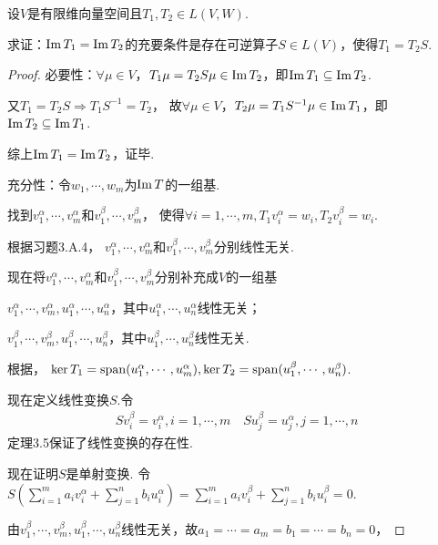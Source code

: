 \newpage

\begin{problem}[5]\label{3.D.5}
    设\(V\)是有限维向量空间且\(T_1,T_2 \in L(V,W)\).

    求证：\(\operatorname{Im} T_1=\operatorname{Im} T_2\)的充要条件是存在可逆算子\(S \in L(V)\)，使得\(T_1=T_2S\).    
\end{problem}

\begin{proof}
    必要性：\(\forall \mu \in V\)，\(T_1 \mu =T_2S \mu \in \operatorname{Im} T_2\)，即\(\operatorname{Im} T_1 \subseteq \operatorname{Im} T_2\).

    又\(T_1=T_2S \Rightarrow T_1S^{-1}=T_2\)，
    故\(\forall \mu \in V\)，\(T_2 \mu =T_1S^{-1} \mu \in \operatorname{Im} T_1\)，即\(\operatorname{Im} T_2 \subseteq \operatorname{Im} T_1\).
    
    综上\(\operatorname{Im} T_1=\operatorname{Im} T_2\)，证毕.
    
    充分性：令\(w_1,\cdots,w_m\)为\(\operatorname{Im} T\)的一组基.
    
    找到\(v_1^\alpha,\cdots,v_m^\alpha\)和\(v_1^\beta,\cdots,v_m^\beta\)，
    使得\(\forall i=1,\cdots,m,T_1v_i^\alpha=w_i,T_2v_i^\beta=w_i\).
    
    根据习题3.A.4，%
    \(v_1^\alpha,\cdots,v_m^\alpha\)和\(v_1^\beta,\cdots,v_m^\beta\)分别线性无关.
    
    现在将\(v_1^\alpha,\cdots,v_m^\alpha\)和\(v_1^\beta,\cdots,v_m^\beta\)分别补充成\(V\)的一组基
    
    \(v_1^\alpha,\cdots,v_m^\alpha,u_1^\alpha,\cdots,u_n^\alpha\)，其中\(u_1^\alpha,\cdots,u_n^\alpha\)线性无关；
    
    \(v_1^\beta,\cdots,v_m^\beta,u_1^\beta,\cdots,u_n^\beta\)，其中\(u_1^\beta,\cdots,u_n^\beta\)线性无关.
    
    根据，
    \(\ker T_1=\operatorname{span} (u_1^\alpha,\cdots,u_m^\alpha),\ker T_2=\operatorname{span} (u_1^\beta,\cdots,u_n^\beta)\).
    
    现在定义线性变换\(S\).令
    \begin{align*}
        Sv_i^\beta=v_i^\alpha,i=1,\cdots,m \quad
        Su_j^\beta=u_j^\alpha,j=1,\cdots,n
    \end{align*}
    定理3.5保证了线性变换的存在性.
    
    现在证明\(S\)是单射变换.
    令\(S(\sum_{i=1}^m a_iv_i^\alpha+\sum_{j=1}^n b_iu_i^\alpha)=\sum_{i=1}^m a_iv_i^\beta+\sum_{j=1}^n b_iu_i^\beta=0\).
    
    由\(v_1^\beta,\cdots,v_m^\beta,u_1^\beta,\cdots,u_n^\beta\)线性无关，故\(a_1=\cdots=a_m=b_1=\cdots=b_n=0\)，
    

\end{proof}
